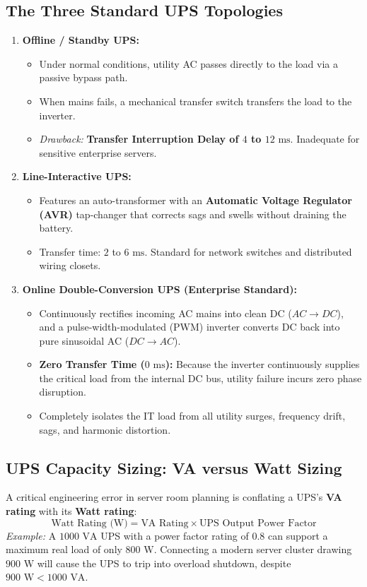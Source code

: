 \subsection{The Three Standard UPS Topologies}
\begin{enumerate}[label=\bfseries\arabic*.]
    \item \textbf{Offline / Standby UPS:}
    \begin{itemize}
        \item Under normal conditions, utility AC passes directly to the load via a passive bypass path.
        \item When mains fails, a mechanical transfer switch transfers the load to the inverter.
        \item \textit{Drawback:} \textbf{Transfer Interruption Delay of $4$ to $12\text{ ms}$}. Inadequate for sensitive enterprise servers.
    \end{itemize}
    \item \textbf{Line-Interactive UPS:}
    \begin{itemize}
        \item Features an auto-transformer with an \textbf{Automatic Voltage Regulator (AVR)} tap-changer that corrects sags and swells without draining the battery.
        \item Transfer time: $2$ to $6\text{ ms}$. Standard for network switches and distributed wiring closets.
    \end{itemize}
    \item \textbf{Online Double-Conversion UPS (Enterprise Standard):}
    \begin{itemize}
        \item Continuously rectifies incoming AC mains into clean DC ($AC \to DC$), and a pulse-width-modulated (PWM) inverter converts DC back into pure sinusoidal AC ($DC \to AC$).
        \item \textbf{Zero Transfer Time ($0\text{ ms}$):} Because the inverter continuously supplies the critical load from the internal DC bus, utility failure incurs zero phase disruption.
        \item Completely isolates the IT load from all utility surges, frequency drift, sags, and harmonic distortion.
    \end{itemize}
\end{enumerate}

\subsection{UPS Capacity Sizing: VA versus Watt Sizing}
A critical engineering error in server room planning is conflating a UPS's \textbf{VA rating} with its \textbf{Watt rating}:
\begin{equation}
\label{eq:ups_watt_sizing}
\boxed{\text{Watt Rating (W)} = \text{VA Rating} \times \text{UPS Output Power Factor}}
\end{equation}
\textit{Example:} A $1000\text{ VA}$ UPS with a power factor rating of $0.8$ can support a maximum real load of only $800\text{ W}$. Connecting a modern server cluster drawing $900\text{ W}$ will cause the UPS to trip into overload shutdown, despite $900\text{ W} < 1000\text{ VA}$.

